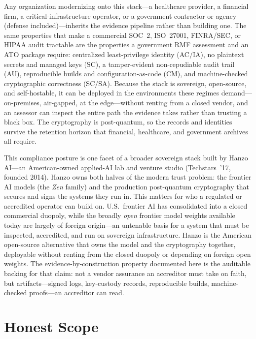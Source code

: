 \documentclass[11pt,letterpaper]{article}
\begin{document}
Any organization modernizing onto this stack---a healthcare provider, a financial
firm, a critical-infrastructure operator, or a government contractor or agency
(defense included)---inherits the evidence pipeline
rather than building one. The same properties that make a commercial SOC~2,
ISO~27001, FINRA/SEC, or HIPAA audit tractable are the properties a government
RMF assessment and an ATO
package require: centralized least-privilege identity (AC/IA), no plaintext secrets
and managed keys (SC), a tamper-evident non-repudiable audit trail (AU), reproducible
builds and configuration-as-code (CM), and machine-checked cryptographic correctness
(SC/SA). Because the stack is sovereign, open-source, and self-hostable, it can be
deployed in the environments these regimes demand---on-premises, air-gapped, at the
edge---without renting from a closed vendor, and an assessor can inspect the entire
path the evidence takes rather than trusting a black box. The cryptography is
post-quantum, so the records and identities survive the retention horizon that
financial, healthcare, and government archives all require.

This compliance posture is one facet of a broader sovereign stack built by Hanzo
AI---an American-owned applied-AI lab and venture studio (Techstars~'17, founded
2014). Hanzo owns both halves of the modern trust problem: the frontier AI models
(the \emph{Zen} family) and the production post-quantum cryptography that secures and
signs the systems they run in. This matters for who a regulated or accredited operator
can build on. U.S.\ frontier AI has consolidated into a closed commercial duopoly,
while the broadly \emph{open} frontier model weights available today are largely of
foreign origin---an untenable basis for a system that must be inspected, accredited,
and run on sovereign infrastructure. Hanzo is the American open-source alternative
that owns the model and the cryptography together, deployable without renting from the
closed duopoly or depending on foreign open weights. The evidence-by-construction
property documented here is the auditable backing for that claim: not a vendor
assurance an accreditor must take on faith, but artifacts---signed logs, key-custody
records, reproducible builds, machine-checked proofs---an accreditor can read.

\section{Honest Scope}
\end{document}
